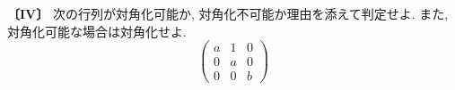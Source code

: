 \noindent\textbf{〔IV〕}
次の行列が対角化可能か, 対角化不可能か理由を添えて判定せよ.
また, 対角化可能な場合は対角化せよ.
\[
\begin{pmatrix}
a & 1 & 0\\
0 & a & 0\\
0 & 0 & b
\end{pmatrix}
\]
